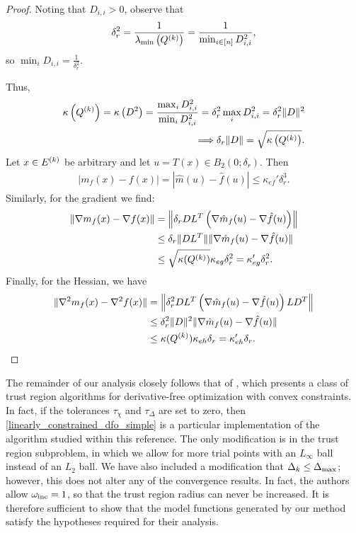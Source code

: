 \documentclass{article}
\begin{document}
\begin{proof}


Noting that $D_{i, i} > 0$, observe that
\begin{align*}
\delta_r^2 = \frac {1} {\lambda_{\text{min}}\left({Q^{(k)}}\right)} = \frac {1} {\min_{i \in [n]} D^2_{i, i}},
\end{align*}
so $\min_{i} D_{i, i} = \frac{1}{\delta_r^2}$.

Thus,
\begin{align*}
{\kappa}\left({Q^{(k)}}\right) 
= \kappa\left(D^2\right) 
= \frac{\max_{i}D_{i,i}^2}{\min_{i}D_{i,i}^2} 
= \delta_r^2 \max_{i}D_{i,i}^2 = \delta_r^2\|D\|^2 \\
\Longrightarrow \delta_r \|D\| = \sqrt{{\kappa}\left({Q^{(k)}}\right)}.
\end{align*}
Let $x \in {E^{(k)}}$ be arbitrary and let $u = T(x) \in B_2(0;\delta_r)$.
Then
\begin{align*}
 | m_f(x) - f(x)| = |\hat m(u) - \hat f(u)| \le \kappa_{ef}'\delta_r^3.
\end{align*}
Similarly, for the gradient we find:
\begin{align*}
\| \nabla m_f(x) - \nabla f(x)\| &= \left\|\delta_rDL^T\left(\nabla\hat m_f(u) - \nabla \hat f(u)\right)\right\| \\
& \le \delta_r \|DL^T\|\|\nabla \hat m_f(u) - \nabla \hat f(u)\| \\
& \le \sqrt{{\kappa}({Q^{(k)}})}\kappa_{eg} \delta_r^2 = \kappa_{eg}' \delta_r^2.
\end{align*}
Finally,  for the Hessian, we have
\begin{align*}
\| \nabla^2 m_f(x) - \nabla^2 f(x)\| & = \left\|\delta_r^2DL^T\left(\nabla\hat m_f(u) - \nabla \hat f(u)\right)LD^T\right\| \\
& \le \delta_r^2 \|D\|^2\|\nabla \hat m_f(u) - \nabla \hat f(u)\| \\
& \le {\kappa}({Q^{(k)}})\kappa_{eh} \delta_r = \kappa_{eh}' \delta_r.
\end{align*}

\end{proof}

The remainder of our analysis closely follows that of \cite{Conejo:2013:GCT:2620806.2621814},
which presents a class of trust region algorithms for derivative-free optimization with convex constraints.
In fact, if the tolerances $\tau_{\chi}$ and $\tau_{\Delta}$ are set to zero,  
then \cref{linearly_constrained_dfo_simple} is a particular implementation of the algorithm studied within this reference.
The only modification is in the trust region subproblem, in which we allow for more trial points with an $L_{\infty}$ ball instead of an $L_2$ ball.
We have also included a modification that $\Delta_k \le {\Delta_{\textrm{max}}}$; however, this does not alter any of the convergence results.  In fact, the authors allow $\omega_{\text{inc}} = 1$, so that the trust region radius can never be increased.
It is therefore sufficient to show that the model functions generated by our method satisfy the hypotheses required for their analysis.
\end{document}
